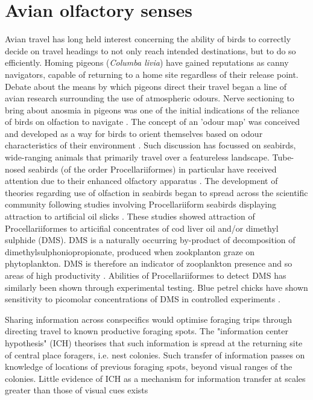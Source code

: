 \documentclass[9pt,twocolumn,twoside,lineno]{pnas-new}
\begin{document}
\section{Avian olfactory senses}
Avian travel has long held interest concerning the ability of birds to correctly decide on travel headings to not only reach intended destinations, but to do so efficiently. Homing pigeons (\textit{Columba livia}) have gained reputations as canny navigators, capable of returning to a home site regardless of their release point. Debate about the means by which pigeons direct their travel began a line of avian research surrounding the use of atmospheric odours. Nerve sectioning to bring about anosmia in pigeons was one of the initial indications of the reliance of birds on olfaction to navigate \citep{Papi_1972}. The concept of an 'odour map' was conceived and developed as a way for birds to orient themselves based on odour characteristics of their environment \citep{Papi_1972,Bonadonna_2003}. Such discussion has focussed on seabirds, wide-ranging animals that primarily travel over a featureless landscape. Tube-nosed seabirds (of the order Procellariiformes) in particular have received attention due to their enhanced olfactory apparatus \citep{Bang_1960, Bang_1971, Jacobs_2012}. The development of theories regarding use of olfaction in seabirds began to spread across the scientific community following studies involving Procellariiform seabirds displaying attraction to artificial oil slicks \citep{Grubb_1972,Dell_Ariccia_2014,Nevitt_1995,Nevitt_1999,Nevitt_2000}. These studies showed attraction of Procellariiformes to articifial concentrates of cod liver oil and/or dimethyl sulphide (DMS). DMS is a naturally occurring by-product of decomposition of dimethylsulphoniopropionate, produced when zookplanton graze on phytoplankton. DMS is therefore an indicator of zooplankton presence and so areas of high productivity \citep{Cantin_1996,Dacey_1986,Jean_2009,Sim__2001}. Abilities of Procellariiformes to detect DMS has similarly been shown through experimental testing. Blue petrel chicks have shown sensitivity to picomolar concentrations of DMS in controlled experiments \citep{Bonadonna_2006}.


Sharing information across conspecifics would optimise foraging trips through directing travel to known productive foraging spots. The "information center hypothesis" (ICH) theorises that such information is spread at the returning site of central place foragers, i.e. nest colonies. Such transfer of information passes on knowledge of locations of previous foraging spots, beyond visual ranges of the colonies. Little evidence of ICH as a mechanism for information transfer at scales greater than those of visual cues exists \citep{Davoren_2003} 
\end{document}
